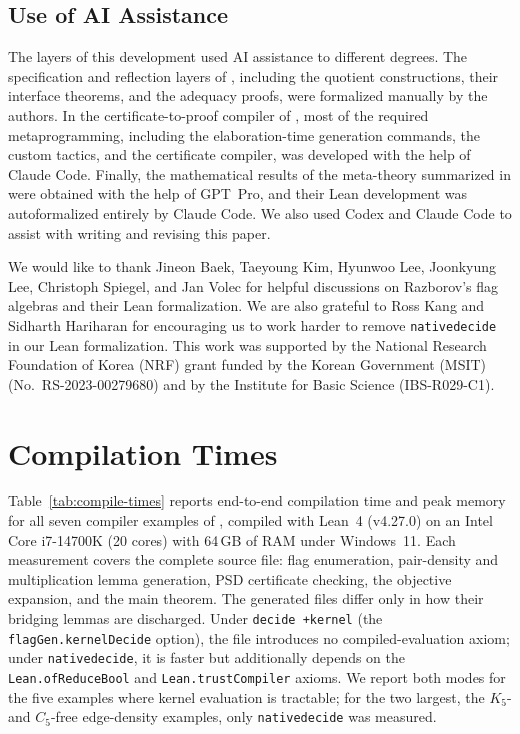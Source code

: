 \documentclass[acmsmall,screen=true,acmthm=false]{acmart}
\DeclareRobustCommand{\lean}[1]{{\def\_{\textunderscore\allowbreak}\texttt{#1}}}
\begin{document}
\subsection*{Use of AI Assistance}
The layers of this development used AI assistance to different degrees.  The
specification and reflection layers of ,
including the quotient constructions, their interface theorems, and the
adequacy proofs, were formalized manually by the authors.  In the
certificate-to-proof compiler of , most of the required
metaprogramming, including the elaboration-time generation commands, the custom
tactics, and the certificate compiler, was developed with the help of
Claude Code.  Finally, the mathematical results of the meta-theory
summarized in  were obtained with the help of GPT~Pro,
and their Lean development was autoformalized entirely by Claude Code.  We
also used Codex and Claude Code to assist with writing and revising this paper.

\begin{acks}
We would like to thank Jineon Baek, Taeyoung Kim, Hyunwoo Lee, Joonkyung Lee, Christoph Spiegel, 
and Jan Volec for helpful discussions on Razborov's flag algebras and their Lean formalization.  
We are also grateful to
Ross Kang and Sidharth Hariharan for encouraging us to work harder to remove
\lean{native\_decide} in our Lean formalization.
This work was supported by the National Research Foundation of Korea (NRF)
grant funded by the Korean Government (MSIT) (No.~RS-2023-00279680) and by the
Institute for Basic Science (IBS-R029-C1).
\end{acks}




\appendix
\section{Compilation Times}
\label{sec:compile-times}

Table~\ref{tab:compile-times} reports end-to-end compilation time and peak
memory for all seven compiler examples of , compiled with
Lean~4 (v4.27.0) on an
Intel Core i7-14700K (20 cores) with 64\,GB of RAM under Windows~11.  Each
measurement covers the complete source file: flag enumeration, pair-density and
multiplication lemma generation, PSD certificate checking, the objective
expansion, and the main theorem.  The generated
files differ only in how their bridging lemmas are discharged.  Under \lean{decide +kernel} (the
\lean{flagGen.kernelDecide} option), the file introduces no compiled-evaluation
axiom; under \lean{native\_decide}, it is faster but additionally depends on the
\lean{Lean.ofReduceBool} and \lean{Lean.trustCompiler} axioms.  We report both
modes for the five examples where kernel evaluation is tractable; for the two
largest, the $K_5$- and $C_5$-free edge-density examples, only
\lean{native\_decide} was measured.
\end{document}
